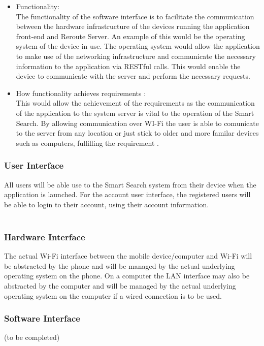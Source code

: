 \documentclass[a4paper,10pt]{article}
\begin{document}
{\begin{enumerate}
					\begin{itemize}
					\item Functionality:\\
						The functionality of the software interface is to facilitate the communication between the hardware infrastructure of the devices running the application front-end and Reroute Server. An example of this would be the operating system of the device in use. The operating system would allow the application to make use of the networking infrastructure and communicate the necessary information to the application via RESTful calls. This would enable the device to communicate with the server and perform the necessary requests.
\\
					\item How functionality achieves requirements :\\
This would allow the achievement of the requirements as the communication of the application to the system server is vital to the operation of the Smart Search. By allowing communication over WI-Fi the user is able to comunicate to the server from any location  or just stick to older and more familar devices such as computers, fulfilling the requirement .
					\end{itemize}
			\end{enumerate} 
}

		
            \subsubsection{User Interface}
	    {All users will be able use to the Smart Search system from their device when the application is launched.
For the account user interface, the registered users will be able to login to their account, using their account information.
\\\\
}

\subsubsection{Hardware Interface}
		{
The actual Wi-Fi interface between the mobile device/computer and Wi-Fi will be abstracted by the phone and will be managed by the actual underlying operating system on the phone. On a computer the LAN interface may also be abstracted by the computer and will be managed by the actual underlying operating system on the computer if a wired connection is to be used.}
            \subsubsection{Software Interface}
            (to be completed)
\end{document}
